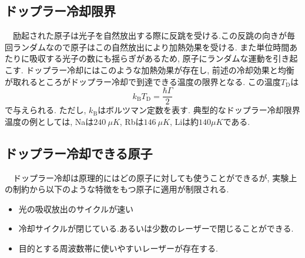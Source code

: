 \documentclass[uplatex, dvipdfmx, a4paper, report, papersize, 11pt]{jsbook}
\begin{document}
\subsection{ドップラー冷却限界}
　励起された原子は光子を自然放出する際に反跳を受ける.この反跳の向きが毎回ランダムなので原子はこの自然放出により加熱効果を受ける. また単位時間あたりに吸収する光子の数にも揺らぎがあるため, 原子にランダムな運動を引き起こす.
ドップラー冷却にはこのような加熱効果が存在し, 前述の冷却効果と均衡が取れるところがドップラー冷却で到達できる温度の限界となる. この温度$T _ { \mathrm { D } }$は
\begin{equation}
  k _ { \mathrm { B } } T _ { \mathrm { D } } = \frac { \hbar \Gamma } { 2 }
\end{equation}
で与えられる. ただし, $k _ { \mathrm { B } }$はボルツマン定数を表す. 典型的なドップラー冷却限界温度の例としては, Naは$240\ \mu K$, Rbは$146\ \mu K$, Liは約$140 \mu K$である\cite{PhysRevX.6.041004, ubcthesis, 気体原子のレーザー冷却}.
\subsection{ドップラー冷却できる原子}
　ドップラー冷却は原理的にはどの原子に対しても使うことができるが, 実験上の制約から以下のような特徴をもつ原子に適用が制限される\cite{ノーベル賞と分光学}.
\begin{itemize}
  \item 光の吸収放出のサイクルが速い
  \item 冷却サイクルが閉じている.あるいは少数のレーザーで閉じることができる.
  \item 目的とする周波数帯に使いやすいレーザーが存在する.
\end{itemize}

\newpage
\end{document}
